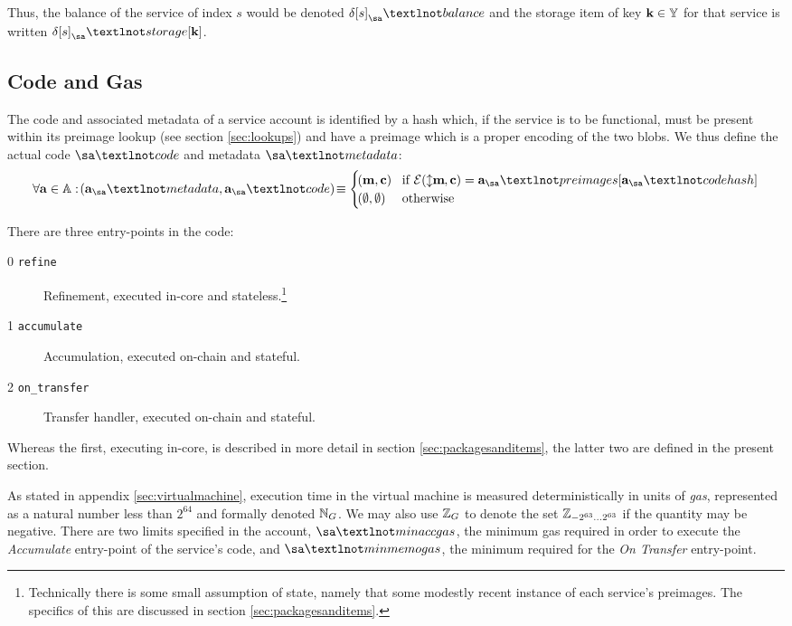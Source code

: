Thus, the balance of the service of index $s$ would be denoted $\accounts\subb{s}_\sa¬balance$ and the storage item of key $\mathbf{k} \in \mathbb{Y}$ for that service is written $\accounts\subb{s}_\sa¬storage[\mathbf{k}]$.








\subsection{Code and Gas}

The code and associated metadata of a service account is identified by a hash which, if the service is to be functional, must be present within its preimage lookup (see section \ref{sec:lookups}) and have a preimage which is a proper encoding of the two blobs. We thus define the actual code $\sa¬code$ and metadata $\sa¬metadata$:
\begin{align}
  \forall \mathbf{a} \in \serviceaccount : \tup{\mathbf{a}_\sa¬metadata, \mathbf{a}_\sa¬code} \equiv \begin{cases}
    \tup{\mathbf{m}, \mathbf{c}} &\when \encode{\var{\mathbf{m}}, \mathbf{c}} = \mathbf{a}_\sa¬preimages[\mathbf{a}_\sa¬codehash] \\
    \tup{\none, \none} &\otherwise
  \end{cases}
\end{align}

There are three entry-points in the code:
\begin{description}
  \item[0 \texttt{refine}]Refinement, executed in-core and stateless.\footnote{Technically there is some small assumption of state, namely that some modestly recent instance of each service's preimages. The specifics of this are discussed in section \ref{sec:packagesanditems}.}
  \item[1 \texttt{accumulate}] Accumulation, executed on-chain and stateful.
  \item[2 \texttt{on\_transfer}] Transfer handler, executed on-chain and stateful.
\end{description}

Whereas the first, executing in-core, is described in more detail in section \ref{sec:packagesanditems}, the latter two are defined in the present section.

As stated in appendix \ref{sec:virtualmachine}, execution time in the \Jam virtual machine is measured deterministically in units of \emph{gas}, represented as a natural number less than $2^{64}$ and formally denoted $\mathbb{N}_G$. We may also use $\mathbb{Z}_G$ to denote the set $\mathbb{Z}_{-2^{63}\dots2^{63}}$ if the quantity may be negative. There are two limits specified in the account, $\sa¬minaccgas$, the minimum gas required in order to execute the \emph{Accumulate} entry-point of the service's code, and $\sa¬minmemogas$, the minimum required for the \emph{On Transfer} entry-point.










